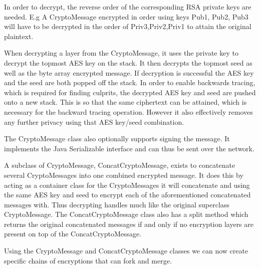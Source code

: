 \documentclass[a4paper,11pt]{kth-mag}
\begin{document}
In order to decrypt, the reverse order of the corresponding RSA private keys are needed. E.g A CryptoMessage encrypted in order using keys Pub1, Pub2, Pub3 will have to be decrypted in the order of Priv3,Priv2,Priv1 to attain the original plaintext.

When decrypting a layer from the CryptoMessage, it uses the private key to decrypt the topmost AES key on the stack. It then decrypts the topmost seed as well as the byte array encrypted message. If decryption is successful the AES key and the seed are both popped off the stack. In order to enable backwards tracing, which is required for finding culprits, the decrypted AES key and seed are pushed onto a new stack. This is so that the same ciphertext can be attained, which is necessary for the backward tracing operation. However it also effectively removes any further privacy using that AES key/seed combination.

The CryptoMessage class also optionally supports signing the message. It implements the Java Serializable interface and can thus be sent over the network.

A subclass of CryptoMessage, ConcatCryptoMessage, exists to concatenate several CryptoMessages into one combined encrypted message. It does this by acting as a container class for the CryptoMessages it will concatenate and using the same AES key and seed to encrypt each of the aforementioned concatenated messages with. Thus decrypting handles much like the original superclass CryptoMessage. The ConcatCryptoMessage class also has a split method which returns the original concatenated messages if and only if no encryption layers are present on top of the ConcatCryptoMessage.

Using the CryptoMessage and ConcatCryptoMessage classes we can now create specific chains of encryptions that can fork and merge.
\end{document}

